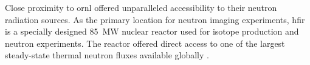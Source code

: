 \documentclass[../../../main.tex]{subfiles}%
\begin{document}
%
    \Xsubsection%
    Close proximity to \gls{ornl} offered unparalleled accessibility to their neutron radiation sources.
    As the primary location for neutron imaging experiments, \gls{hfir} is a specially designed \SI{85}{\mega\watt} nuclear reactor used for isotope production and neutron experiments.
    The reactor offered direct access to one of the largest steady-state thermal neutron fluxes available globally \cite{website:High_Flux_Isotope_Reactor}.
\end{document}
